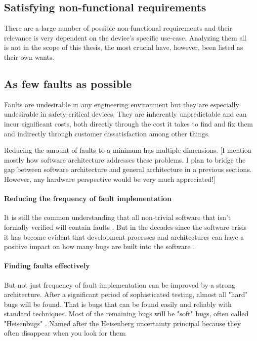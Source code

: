 \subsection{Satisfying non-functional requirements}
There are a large number of possible non-functional requirements and their relevance is very dependent on the device's specific use-case. Analyzing them all is not in the scope of this thesis, the most crucial have, however, been listed as their own wants. 

\subsection{As few faults as possible}
Faults are undesirable in any engineering environment but they are especially undesirable in safety-critical devices. They are inherently unpredictable and can incur significant costs, both directly through the cost it takes to find and fix them and indirectly through customer dissatisfaction among other things.

Reducing the amount of faults to a minimum has multiple dimensions. 
[I mention mostly how software architecture addresses these problems. I plan to bridge the gap between software architecture and general architecture in a previous sections. However, any hardware perspective would be very much appreciated!]
\paragraph{Reducing the frequency of fault implementation}
It is still the common understanding that all non-trivial software that isn't formally verified will contain faults \cite{Klein.2009}. But in the decades since the software crisis it has become evident that development processes and architectures can have a positive impact on how many bugs are built into the software \cite{Randell.1996}.  
\paragraph{Finding faults effectively}
But not just frequency of fault implementation can be improved by a strong architecture. After a significant period of sophisticated testing, almost all "hard" bugs will be found. That is bugs that can be found easily and reliably
with standard techniques. Most of the remaining bugs will be "soft" bugs, often called "Heisenbugs" \cite{Gray.1986}. Named after the Heisenberg uncertainty principal because they often disappear when you look for them. 

